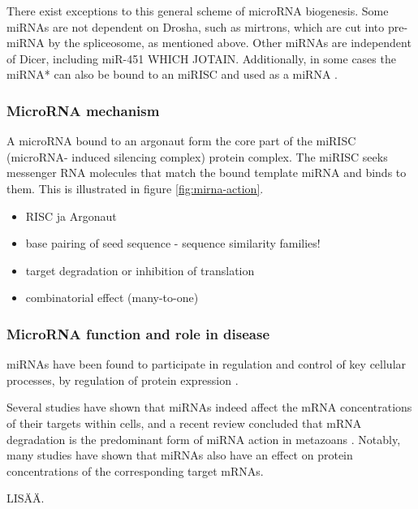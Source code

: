 There exist exceptions to this general scheme of microRNA biogenesis. Some
miRNAs are not dependent on Drosha, such as mirtrons, which are cut into pre-
miRNA by the spliceosome, as mentioned above. Other miRNAs are independent of
Dicer, including miR-451 WHICH JOTAIN. Additionally, in some cases the miRNA*
can also be bound to an miRISC and used as a miRNA \citep{CITE}.





\subsubsection{MicroRNA mechanism}\label{microrna-mechanism}

A microRNA bound to an argonaut form the core part of the miRISC (microRNA-
induced silencing complex) protein complex. The miRISC seeks messenger RNA
molecules that match the bound template miRNA and binds to them. This is illustrated
in figure \ref{fig:mirna-action}.

\begin{itemize}
\item
  RISC ja Argonaut
\item
  base pairing of seed sequence - sequence similarity families!
\item
  target degradation or inhibition of translation
\item
  combinatorial effect (many-to-one)
\end{itemize}





\subsubsection{MicroRNA function and role in disease}\label{microrna-function-and-role-in-disease}

miRNAs have been found to participate in regulation and control of key
cellular processes, by regulation of protein expression \citep{Bushati2007}.

Several studies have shown that miRNAs indeed affect the mRNA concentrations
of their targets within cells, and a recent review concluded that mRNA
degradation is the predominant form of miRNA action in metazoans
\citep{Guo2010}. Notably, many studies have shown that miRNAs also have an
effect on protein concentrations of the corresponding target mRNAs. \citep{??}

LISÄÄ.

